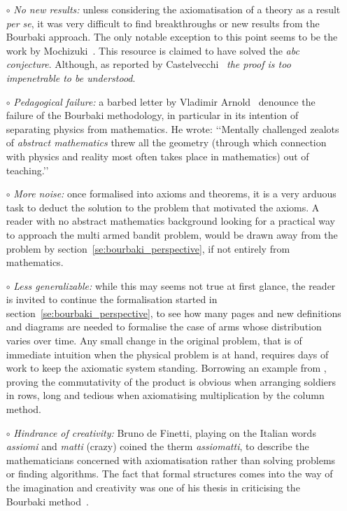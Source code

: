 \documentclass[]{scrartcl}
\theoremstyle{definition}
\begin{document}
\begin{itemize}

    \item[$\circ$] \emph{No new results:} unless considering the axiomatisation of a theory as a result \emph{per se}, it was very difficult to find breakthroughs or new results from the Bourbaki approach. The only notable exception to this point seems to be the work by Mochizuki~\cite{mochizuki2012inter}. This resource is claimed to have solved the \emph{abc conjecture}. Although, as reported by Castelvecchi~\cite{castelvecchi2015biggest} \emph{the proof is too impenetrable to be understood}.
     
    \item[$\circ$] \emph{Pedagogical failure:} a barbed letter by Vladimir Arnold~\cite{arnol1998teaching} denounce the failure of the Bourbaki methodology, in particular in its intention of separating physics from mathematics. He wrote: \lq\lq Mentally challenged zealots of \emph{abstract mathematics} threw all the geometry (through which connection with physics and reality most often takes place in mathematics) out of teaching.\rq\rq
    
    \item[$\circ$] \emph{More noise:} once formalised into axioms and theorems, it is a very arduous task to deduct the solution to the problem that motivated the axioms. A reader with no abstract mathematics background looking for a practical way to approach the multi armed bandit problem, would be drawn away from the problem by section~\ref{se:bourbaki_perspective}, if not entirely from mathematics. 
     
    \item[$\circ$] \emph{Less generalizable:} while this may seems not true at first glance, the reader is invited to continue the formalisation started in section~\ref{se:bourbaki_perspective}, to see how many pages and new definitions and diagrams are needed to formalise the case of arms whose distribution varies over time. Any small change in the original problem, that is of immediate intuition when the physical problem is at hand, requires days of work to keep the axiomatic system standing. Borrowing an example from \cite{arnol1998teaching}, proving the commutativity of the product is obvious when arranging soldiers in rows, long and tedious when axiomatising multiplication by the column method.
    
    \item[$\circ$] \emph{Hindrance of creativity:} Bruno de Finetti, playing on the Italian words \emph{assiomi} and \emph{matti} (crazy) coined the therm \emph{assiomatti}, to describe the mathematicians concerned with axiomatisation rather than solving problems or finding algorithms. The fact that formal structures comes into the way of the imagination and creativity was one of his thesis in criticising the Bourbaki method~\cite{de2008bruno}.


\end{itemize}
\end{document}
